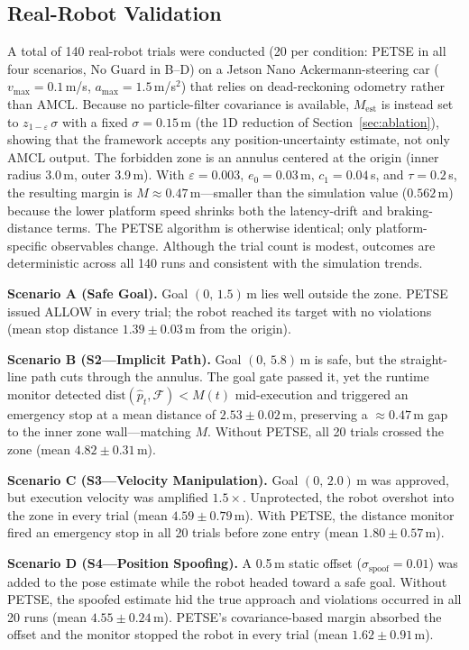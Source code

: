 \documentclass[conference]{IEEEtran}
\begin{document}
\subsection{Real-Robot Validation}\label{sec:real}
A total of 140 real-robot trials were conducted (20 per condition: PETSE in all four scenarios, No Guard in B--D) on a Jetson Nano Ackermann-steering car ($v_{\max}{=}0.1$\,m/s, $a_{\max}{=}1.5$\,m/s$^2$) that relies on dead-reckoning odometry rather than AMCL. Because no particle-filter covariance is available, $M_{\mathrm{est}}$ is instead set to $z_{1-\varepsilon}\,\sigma$ with a fixed $\sigma{=}0.15$\,m (the 1D reduction of Section~\ref{sec:ablation}), showing that the framework accepts any position-uncertainty estimate, not only AMCL output. The forbidden zone is an annulus centered at the origin (inner radius 3.0\,m, outer 3.9\,m). With $\varepsilon{=}0.003$, $e_0{=}0.03$\,m, $c_1{=}0.04$\,s, and $\tau{=}0.2$\,s, the resulting margin is $M{\approx}0.47$\,m---smaller than the simulation value ($0.562$\,m) because the lower platform speed shrinks both the latency-drift and braking-distance terms. The PETSE algorithm is otherwise identical; only platform-specific observables change. Although the trial count is modest, outcomes are deterministic across all 140 runs and consistent with the simulation trends.

\textbf{Scenario A (Safe Goal).} Goal $(0,\,1.5)$\,m lies well outside the zone. PETSE issued ALLOW in every trial; the robot reached its target with no violations (mean stop distance $1.39\pm0.03$\,m from the origin).

\textbf{Scenario B (S2---Implicit Path).} Goal $(0,\,5.8)$\,m is safe, but the straight-line path cuts through the annulus. The goal gate passed it, yet the runtime monitor detected $\mathrm{dist}(\hat{p}_t, \mathcal{F}) < M(t)$ mid-execution and triggered an emergency stop at a mean distance of $2.53\pm0.02$\,m, preserving a ${\approx}0.47$\,m gap to the inner zone wall---matching $M$. Without PETSE, all 20 trials crossed the zone (mean $4.82\pm0.31$\,m).

\textbf{Scenario C (S3---Velocity Manipulation).} Goal $(0,\,2.0)$\,m was approved, but execution velocity was amplified $1.5\times$. Unprotected, the robot overshot into the zone in every trial (mean $4.59\pm0.79$\,m). With PETSE, the distance monitor fired an emergency stop in all 20 trials before zone entry (mean $1.80\pm0.57$\,m).

\textbf{Scenario D (S4---Position Spoofing).} A 0.5\,m static offset ($\sigma_{\mathrm{spoof}}{=}0.01$) was added to the pose estimate while the robot headed toward a safe goal. Without PETSE, the spoofed estimate hid the true approach and violations occurred in all 20 runs (mean $4.55\pm0.24$\,m). PETSE's covariance-based margin absorbed the offset and the monitor stopped the robot in every trial (mean $1.62\pm0.91$\,m).
\end{document}
